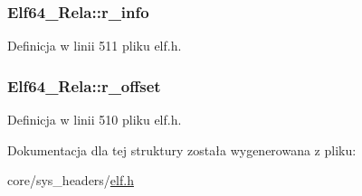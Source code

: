 \hypertarget{struct_elf64___rela_aeab8bc0f9035184127ec02d947bf2c76}{
\subsubsection[{r\-\_\-info}]{ Elf64\-\_\-\-Rela\-::r\-\_\-info}}\label{struct_elf64___rela_aeab8bc0f9035184127ec02d947bf2c76}


Definicja w linii 511 pliku elf.\-h.

\hypertarget{struct_elf64___rela_a9ea7e07ec6e0d57bf4bcd53b89de7948}{
\subsubsection[{r\-\_\-offset}]{ Elf64\-\_\-\-Rela\-::r\-\_\-offset}}\label{struct_elf64___rela_a9ea7e07ec6e0d57bf4bcd53b89de7948}


Definicja w linii 510 pliku elf.\-h.



Dokumentacja dla tej struktury została wygenerowana z pliku\-:\begin{DoxyCompactItemize}
\item 
core/sys\-\_\-headers/\hyperlink{elf_8h}{elf.\-h}\end{DoxyCompactItemize}
